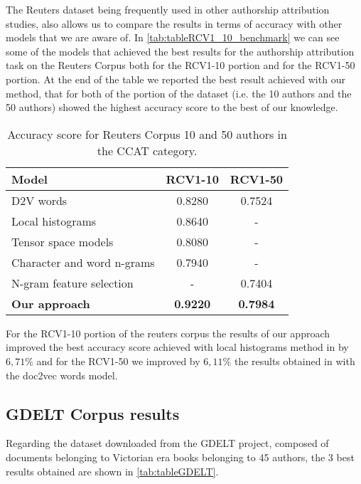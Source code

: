 The Reuters dataset being frequently used in other authorship attribution studies, also allows us to compare the results in terms of accuracy with other models that we are aware of.
In \autoref{tab:tableRCV1_10_benchmark} we can see some of the models that achieved the best results for the authorship attribution task on the Reuters Corpus both for the RCV1-10 portion and for the RCV1-50 portion.
At the end of the table we reported the best result achieved with our method, that for both of the portion of the dataset (i.e. the 10 authors and the 50 authors) showed the highest accuracy score to the best of our knowledge.
\begin{table}[h!]
	\begin{center}  
		\caption[Reuters Corpus Benchmark - 10 and 50 authors]{Accuracy score for Reuters Corpus 10 and 50 authors in the CCAT category.} 
		\label{tab:tableRCV1_10_benchmark}
		\begin{tabular}{| p{5 cm} | c | c |}
			\hline 
			Model & RCV1-10 & RCV1-50 \\
			\hline
			D2V words\cite{posadas2017application} & 0.8280 & 0.7524 \\ \hline
			Local histograms \cite{sari2017continuous} & 0.8640 & - \\ \hline
			Tensor space models \cite{plakias2008tensor} & 0.8080 & - \\ \hline
			Character and word n-grams \cite{sapkota2015not} & 0.7940 & - \\ \hline
			N-gram feature selection \cite{houvardas2006n} & - & 0.7404 \\ \hline
			\textbf{Our approach} & \textbf{0.9220} & \textbf{0.7984} \\ \hline
		\end{tabular} 
	\end{center}
\end{table}

For the RCV1-10 portion of the reuters corpus the results of our approach improved the best accuracy score achieved with local histograms method in \cite{sari2017continuous} by $6,71\%$ and for the RCV1-50 we improved by $6,11\%$ the results obtained in \cite{posadas2017application} with the doc2vec words model.


\subsection{GDELT Corpus results}
Regarding the dataset downloaded from the GDELT project, composed of documents belonging to Victorian era books belonging to 45 authors, the 3 best results obtained are shown in \autoref{tab:tableGDELT}. 

